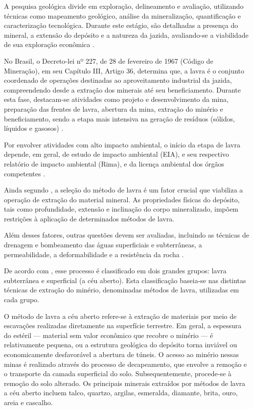 A pesquisa geológica divide em exploração, delineamento e avaliação,
utilizando técnicas como mapeamento geológico, análise da mineralização,
quantificação e caracterização tecnológica. Durante este estágio, são
detalhadas a presença do mineral, a extensão do depósito e a natureza da
jazida, avaliando-se a viabilidade de sua exploração econômica \cite{carvalho2018sustentabilidade}.

No Brasil, o Decreto-lei nº 227, de 28 de fevereiro de 1967 (Código de
Mineração), em seu Capítulo III, Artigo 36, determina que, a lavra é o
conjunto coordenado de operações destinadas ao aproveitamento industrial
da jazida, compreendendo desde a extração dos minerais até seu
beneficiamento. Durante esta fase, destacam-se atividades como projeto e
desenvolvimento da mina, preparação das frentes de lavra, abertura da
mina, extração do minério e beneficiamento, sendo a etapa mais intensiva
na geração de resíduos (sólidos, líquidos e gasosos) \cite{brasil1967decreto}.

Por envolver atividades com alto impacto ambiental, o início da etapa de
lavra depende, em geral, de estudo de impacto ambiental (EIA), e seu
respectivo relatório de impacto ambiental (Rima), e da licença ambiental
dos órgãos competentes \cite[p.342]{carvalho2018sustentabilidade}.

Ainda segundo \cite[p.343]{carvalho2018sustentabilidade}, a seleção do método de
lavra é um fator crucial que viabiliza a operação de extração do
material mineral. As propriedades físicas do depósito, tais como
profundidade, extensão e inclinação do corpo mineralizado, impõem
restrições à aplicação de determinados métodos de lavra.

Além desses fatores, outras questões devem ser avaliadas, incluindo as
técnicas de drenagem e bombeamento das águas superficiais e
subterrâneas, a permeabilidade, a deformabilidade e a resistência da
rocha \cite[p.343]{carvalho2018sustentabilidade}.

De acordo com \cite{minasjr2019lavra}, esse processo é classificado em dois
grandes grupos: lavra subterrânea e superficial (a céu aberto). Esta
classificação baseia-se nas distintas técnicas de extração do minério,
denominadas métodos de lavra, utilizadas em cada grupo.

O método de lavra a céu aberto refere-se à extração de materiais por
meio de escavações realizadas diretamente na superfície terrestre. Em
geral, a espessura do estéril --- material sem valor econômico que
recobre o minério --- é relativamente pequena, ou a estrutura geológica
do depósito torna inviável ou economicamente desfavorável a abertura de
túneis. O acesso ao minério nessas minas é realizado através do processo
de decapeamento, que envolve a remoção e o transporte da camada
superficial do solo. Subsequentemente, procede-se à remoção do solo
alterado. Os principais minerais extraídos por métodos de lavra a céu
aberto incluem talco, quartzo, argilas, esmeralda, diamante, brita,
ouro, areia e cascalho.

